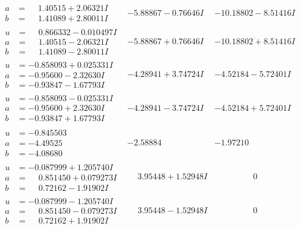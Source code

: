 \documentclass[1p]{elsarticle_modified}
\theoremstyle{definition}
\begin{document}
$$\begin{array}{c|c|c}
\begin{aligned}
a &= \phantom{-}1.40515 + 2.06321 I \\
b &= \phantom{-}1.41089 + 2.80011 I\end{aligned}
 & -5.88867 - 0.76646 I & -10.18802 - 8.51416 I \\ \hline\begin{aligned}
u &= \phantom{-}0.866332 - 0.010497 I \\
a &= \phantom{-}1.40515 - 2.06321 I \\
b &= \phantom{-}1.41089 - 2.80011 I\end{aligned}
 & -5.88867 + 0.76646 I & -10.18802 + 8.51416 I \\ \hline\begin{aligned}
u &= -0.858093 + 0.025331 I \\
a &= -0.95600 - 2.32630 I \\
b &= -0.93847 - 1.67793 I\end{aligned}
 & -4.28941 + 3.74724 I & -4.52184 - 5.72401 I \\ \hline\begin{aligned}
u &= -0.858093 - 0.025331 I \\
a &= -0.95600 + 2.32630 I \\
b &= -0.93847 + 1.67793 I\end{aligned}
 & -4.28941 - 3.74724 I & -4.52184 + 5.72401 I \\ \hline\begin{aligned}
u &= -0.845503\phantom{ +0.000000I} \\
a &= -4.49525\phantom{ +0.000000I} \\
b &= -4.08680\phantom{ +0.000000I}\end{aligned}
 & -2.58884\phantom{ +0.000000I} & -1.97210\phantom{ +0.000000I} \\ \hline\begin{aligned}
u &= -0.087999 + 1.205740 I \\
a &= \phantom{-}0.851450 + 0.079273 I \\
b &= \phantom{-}0.72162 - 1.91902 I\end{aligned}
 & \phantom{-}3.95448 + 1.52948 I & \phantom{-0.000000 } 0 \\ \hline\begin{aligned}
u &= -0.087999 - 1.205740 I \\
a &= \phantom{-}0.851450 - 0.079273 I \\
b &= \phantom{-}0.72162 + 1.91902 I\end{aligned}
 & \phantom{-}3.95448 - 1.52948 I & \phantom{-0.000000 } 0 \\ \hline\begin{aligned}

\end{aligned}
\end{array}$$
\end{document}
